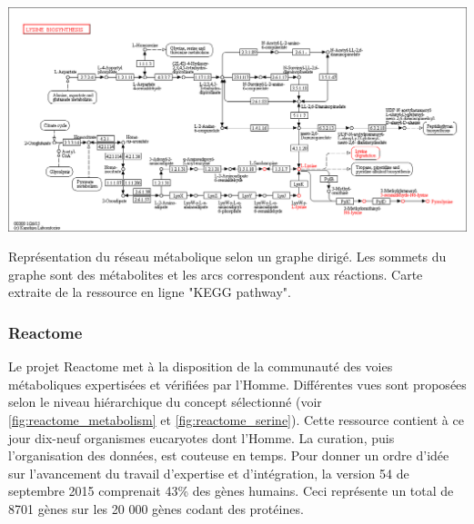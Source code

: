\begin{refsegment}
    \begin{shadedfigure}[H]
        \centering
        \includegraphics[width=\textwidth]{img/kegg_lysine.png}
        \caption{ Représentation du réseau métabolique selon un graphe dirigé. Les sommets du graphe sont des métabolites et les arcs correspondent aux réactions. Carte extraite de la ressource en ligne "KEGG pathway". }
        \label{fig:kegg_lysine}
    \end{shadedfigure}
    
    \subsubsection{Reactome}
    Le projet Reactome \cite{joshi2005reactome,matthews2009reactome,croft2010reactome,croft2014reactome,fabregat2016reactome} met à la disposition de la communauté des voies métaboliques expertisées et vérifiées par l'Homme. Différentes vues sont proposées selon le niveau hiérarchique du concept sélectionné (voir \cref{fig:reactome_metabolism} et \cref{fig:reactome_serine}). Cette ressource contient à ce jour dix-neuf organismes eucaryotes dont l’Homme. La curation, puis l'organisation des données, est couteuse en temps. Pour donner un ordre d'idée sur l'avancement du travail d'expertise et d'intégration, la version 54 de septembre 2015 comprenait 43\% des gènes humains. Ceci représente un total de 8701 gènes sur les 20 000 gènes codant des protéines.
    

\end{refsegment}
